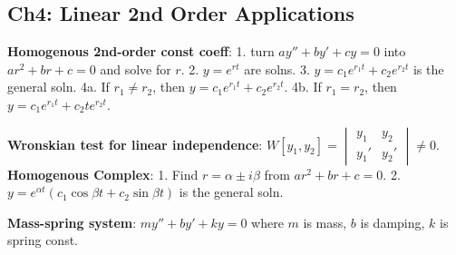 \subsection*{Ch4: Linear 2nd Order Applications}

\textbf{Homogenous 2nd-order const coeff}: 1. turn
$ay'' + by' + cy = 0$ into $ar^2 + br + c = 0$ and solve for $r$. 
2. $y = e^{rt}$ are solns. 3. $y = c_1e^{r_1t} + c_2e^{r_2t}$ is the general soln.
4a. If $r_1 \neq r_2$, then $y = c_1e^{r_1t} + c_2e^{r_2t}$. 
4b. If $r_1 = r_2$, then $y = c_1e^{r_1t} + c_2te^{r_2t}$.

\textbf{Wronskian test for linear independence}: 
$W[y_1, y_2] = \begin{vmatrix} y_1 & y_2 \\ y_1' & y_2' \end{vmatrix} \neq 0$. \\

\textbf{Homogenous Complex}: 
1. Find $r = \alpha \pm i\beta$ from $ar^2 + br + c = 0$. 
2. $y = e^{\alpha t}(c_1\cos{\beta t} + c_2\sin{\beta t})$ is the general soln.

\textbf{Mass-spring system}: $my'' + by' + ky = 0$ where $m$ is mass, $b$ is damping, $k$ is spring const.